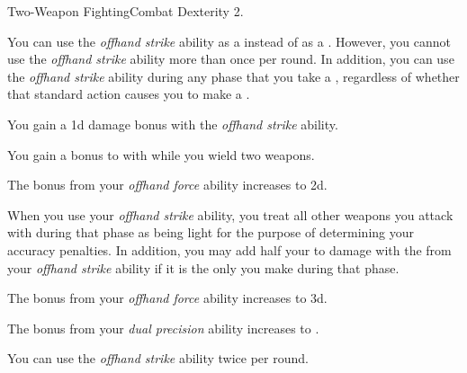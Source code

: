     \begin{feat}{Two-Weapon Fighting}{Combat}
        \featpre Dexterity 2.

         You can use the \textit{offhand strike} ability as a  instead of as a .
        However, you cannot use the \textit{offhand strike} ability more than once per round.
        In addition, you can use the \textit{offhand strike} ability during any phase that you take a , regardless of whether that standard action causes you to make a .

         You gain a \plus1d damage bonus with the \textit{offhand strike} ability.

         You gain a  bonus to  with  while you wield two weapons.

         The bonus from your \textit{offhand force} ability increases to \plus2d.

         When you use your \textit{offhand strike} ability, you treat all other weapons you attack with during that phase as being light for the purpose of determining your accuracy penalties.
        In addition, you may add half your  to damage with the  from your \textit{offhand strike} ability if it is the only  you make during that phase.

         The bonus from your \textit{offhand force} ability increases to \plus3d.

         The bonus from your \textit{dual precision} ability increases to .

         You can use the \textit{offhand strike} ability twice per round.
    \end{feat}

